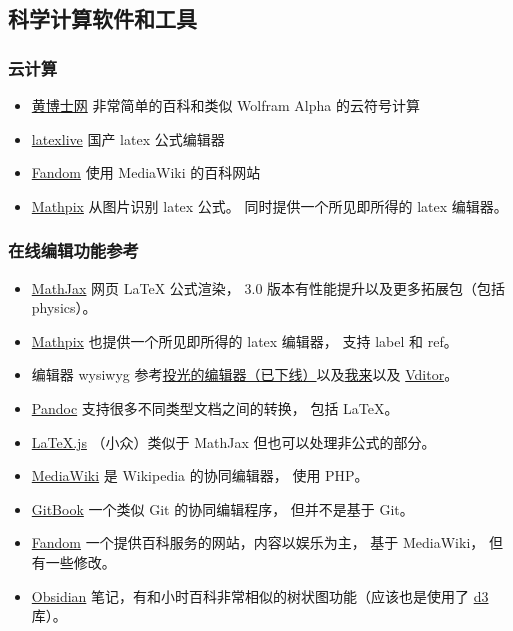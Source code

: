 \subsection{科学计算软件和工具}
\subsubsection{云计算}
\begin{itemize}
\item \href{http://www.drhuang.com}{黄博士网} 非常简单的百科和类似 Wolfram Alpha 的云符号计算
\item \href{https://www.latexlive.com}{latexlive} 国产 latex 公式编辑器
\item \href{https://harrypotter.fandom.com}{Fandom} 使用 MediaWiki 的百科网站
\item \href{https://mathpix.com}{Mathpix} 从图片识别 latex 公式。 同时提供一个所见即所得的 latex 编辑器。
\end{itemize}

\subsubsection{在线编辑功能参考}
\begin{itemize}
\item \href{https://www.mathjax.org}{MathJax} 网页 LaTeX 公式渲染， 3.0 版本有性能提升以及更多拓展包（包括 physics）。
\item \href{https://mathpix.com/ocr?gclid=CjwKCAiAy_CcBhBeEiwAcoMRHKnSPGjROmFGBj5R_Ev3hke7lG7xNIzKDHv5FgkMFq62aXRpISt_LhoC47YQAvD_BwE}{Mathpix} 也提供一个所见即所得的 latex 编辑器， 支持 label 和 ref。
\item 编辑器 wysiwyg 参考\href{https://editoe.com}{投光的编辑器（已下线）}以及\href{https://www.wolai.com}{我来}以及 \href{https://github.com/Vanessa219/vditor}{Vditor}。
\item \href{https://pandoc.org/}{Pandoc} 支持很多不同类型文档之间的转换， 包括 LaTeX。
\item \href{https://github.com/michael-brade/LaTeX.js}{LaTeX.js} （小众）类似于 MathJax 但也可以处理非公式的部分。
\item \href{https://www.mediawiki.org/wiki/MediaWiki}{MediaWiki} 是 Wikipedia 的协同编辑器， 使用 PHP。
\item \href{https://www.gitbook.com/}{GitBook} 一个类似 Git 的协同编辑程序， 但并不是基于 Git。
\item \href{https://www.fandom.com/}{Fandom} 一个提供百科服务的网站，内容以娱乐为主， 基于 MediaWiki， 但有一些修改。
\item \href{https://obsidian.md/}{Obsidian} 笔记，有和小时百科非常相似的树状图功能（应该也是使用了 \href{https://d3js.org/}{d3} 库）。
\end{itemize}
